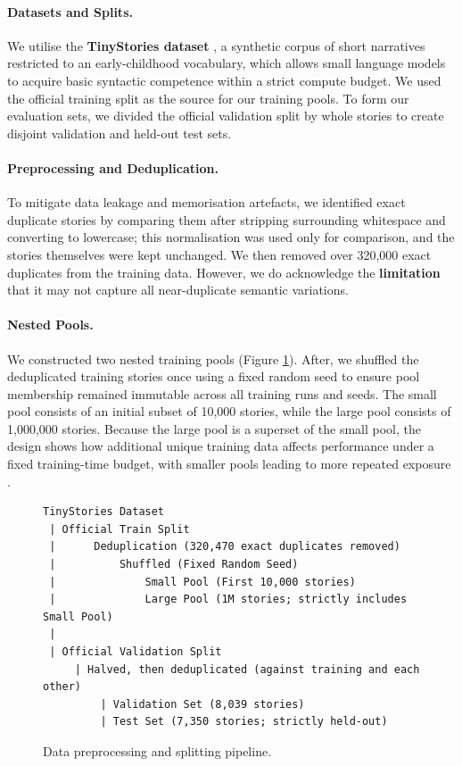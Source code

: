\documentclass[12pt]{article}
\begin{document}
\paragraph{Datasets and Splits.} We utilise the \textbf{TinyStories dataset} \citep{eldan2023tinystories}, a synthetic corpus of short narratives restricted to an early-childhood vocabulary, which allows small language models to acquire basic syntactic competence within a strict compute budget. 
We used the official training split as the source for our training pools. To form our evaluation sets, we divided the official validation split by whole stories to create disjoint validation and held-out test sets.

\paragraph{Preprocessing and Deduplication.} To mitigate data leakage and memorisation artefacts, we identified exact duplicate stories by comparing them after stripping surrounding whitespace and converting to lowercase; this normalisation was used only for comparison, and the stories themselves were kept unchanged.
We then removed over 320,000 exact duplicates from the training data. However, we do acknowledge the \textbf{limitation} that it may not capture all near-duplicate semantic variations.

\paragraph{Nested Pools.} We constructed two nested training pools (Figure \ref{fig:pipeline}). After, we shuffled the deduplicated training stories once using a fixed random seed to ensure pool membership remained immutable across all training runs and seeds. The small pool consists of an initial subset of 10,000 stories, while the large pool consists of 1,000,000 stories. Because the large pool is a superset of the small pool, the design shows how additional unique training data affects performance under a fixed training-time budget, with smaller pools leading to more repeated exposure \cite{muennighoff2023scaling}.

\begin{figure}[h]
\centering
\begin{verbatim}
TinyStories Dataset
 | Official Train Split 
 |      Deduplication (320,470 exact duplicates removed)
 |          Shuffled (Fixed Random Seed)
 |              Small Pool (First 10,000 stories) 
 |              Large Pool (1M stories; strictly includes Small Pool)
 |
 | Official Validation Split
     | Halved, then deduplicated (against training and each other)
         | Validation Set (8,039 stories)
         | Test Set (7,350 stories; strictly held-out)
\end{verbatim}
\caption{Data preprocessing and splitting pipeline.}
\label{fig:pipeline}
\end{figure}
\end{document}
